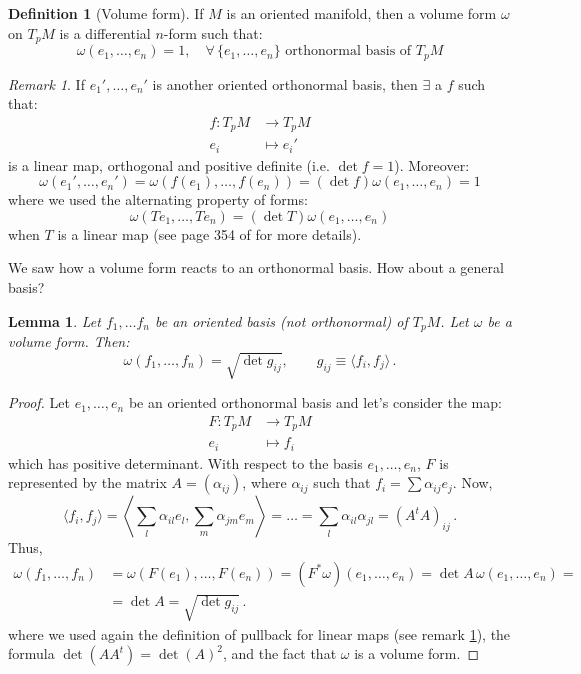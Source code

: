 \documentclass[a4paper,11pt,titlepage, article, oneside]{memoir}
\numberwithin{equation}{section}
\newtheorem{lemma}[theorem]{Lemma}
\theoremstyle{definition}
\newtheorem{definition}[theorem]{Definition}
\theoremstyle{remark}
\newtheorem{remark}[theorem]{Remark}
\begin{document}
\begin{definition}[Volume form]
If $M$ is an oriented manifold, then a volume form $\omega$ on $T_pM$ is a  differential $n$-form such that:
\begin{equation}
\omega(e_1, \ldots, e_n) = 1, \quad \forall\, \{e_1, \ldots, e_n\} \text{ orthonormal basis of }T_pM
\end{equation}
\end{definition}

\begin{remarkbox}\begin{remark} \label{diffbasisrem}
If $e_1', \ldots, e_n'$ is another oriented orthonormal basis, then $\exists$ a $f$ such that:
\begin{align*}
f \colon T_pM &\rightarrow T_p M \\
e_i &\mapsto e_i'
\end{align*}
is a linear map, orthogonal and positive definite (i.e. $\det f = 1$). Moreover:
$$\omega(e_1', \ldots, e_n') = \omega(f(e_1), \ldots, f(e_n))  = (\det f) \omega(e_1, \ldots, e_n) =1$$
where we used the alternating property of forms:
\[ \omega (T e_1, \ldots, T e_n) = (\det T) \omega(e_1, \ldots, e_n) \] when $T$ is a linear map (see page 354 of  for more details).
\end{remark}\end{remarkbox}
We saw how a volume form reacts to an orthonormal basis. How about a general basis?

\begin{lemma}
Let $f_1, \ldots f_n$ be an oriented basis (not orthonormal) of $T_p M$. Let $\omega$ be a volume form. Then:
\begin{equation}
\omega(f_1, \ldots, f_n)=\sqrt{\det g_{ij}}, \qquad g_{ij} \equiv \langle f_i, f_j \rangle  \, .
\end{equation}
\end{lemma}
\begin{proof}
Let $e_1, \ldots, e_n$ be an oriented orthonormal basis and let's consider the map:
\begin{align*}
F \colon T_pM &\rightarrow T_p M \\
e_i &\mapsto f_i
\end{align*}
which has positive determinant. With respect to the basis $e_1, \ldots, e_n$, $F$ is represented by the matrix $A=(\alpha_{ij})$, where $\alpha_{ij}$ such that $f_i = \sum \alpha_{ij} e_j$. Now,
$$\langle f_i, f_j \rangle = \left \langle \sum\limits_l \alpha_{il} e_l, \sum\limits_m \alpha_{jm}e_m \right \rangle = \ldots= \sum\limits_l \alpha_{il}\alpha_{jl} = \left( A^t A \right )_{ij} \, .$$
Thus,
\begin{align*}
\omega(f_1, \ldots, f_n) &= \omega(F(e_1), \ldots, F(e_n)) = (F^* \omega)(e_1, \ldots, e_n)= \det A \, \omega(e_1, \ldots, e_n) =\\
&= \det A = \sqrt{\det g_{ij}} \, .
\end{align*}
where we used again the definition of pullback for linear maps (see remark \ref{diffbasisrem}), the formula $\det(A A^t) = \det(A)^2$, and the fact that $\omega$ is a volume form.
\end{proof}
\end{document}
